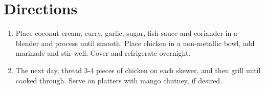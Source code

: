 \section*{Directions}
\begin{enumerate}
	\item Place coconut cream, curry, garlic, sugar, fish sauce and coriander in a blender and process until smooth. Place chicken in a non-metallic bowl, add marinade and stir well. Cover and refrigerate overnight.
	\item The next day, thread 3-4 pieces of chicken on each skewer, and then grill until cooked through. Serve on platters with mango chutney, if desired. 
\end{enumerate}
